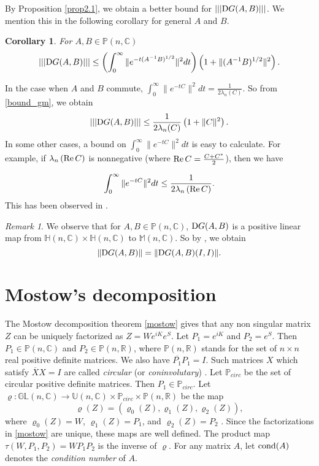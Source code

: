 \documentclass[12pt,epsfig,reqno]{amsart}
\newcommand{\C}{\mathbb{C}}
\newcommand{\R}{\mathbb{R}}
\newcommand{\De}{{\rm D}}
\newtheorem{corollary}[thm]{Corollary}
\theoremstyle{remark}
\newtheorem{remark}[thm]{Remark}
\newcommand{\h}{\mathop{{\rm Re}}}
\begin{document}
By Proposition \ref{prop2.1}, we obtain a better bound for $|||\De G(A,B)|||$. We mention this in the following corollary for general $A$ and $B$.
\begin{corollary}
For $A,B\in \mathbb P(n,\mathbb C)$
\begin{equation}
|||\De G(A,B)|||\leq
\left(\int_0^{\infty} \|e^{-t (A^{-1} B)^{1/2}}\|^2 dt\right)
\left(1+\|(A^{-1} B)^{1/2}\|^2\right).\label{bound_gm}
\end{equation}
\end{corollary}

In the case when $A$ and $B$ commute, $\int_0^{\infty} \|e^{-t C}\|^2 dt=\frac{1}{2\lambda_n(C)}.$
So from \eqref{bound_gm}, we obtain
\begin{equation}
|||\De G(A,B)|||\leq \frac{1}{2 \lambda_n(C)} \left(1+\|C\|^2\right).
\end{equation}
In some other cases, a bound on $\int_0^{\infty} \|e^{-t C}\|^2 dt$   is easy to calculate. For example, if  $\lambda_n\left(\h C\right)$ is nonnegative (where $\h C=\frac{C+C^*}{2}$), then we have

$$\int_0^{\infty} \|e^{-t C}\|^2 dt\leq \frac{1}{2 \lambda_n\left(\h C\right)}.$$
This has been observed in \cite{bhatia_Matrix_factorizations, bhatia_elsner}.

\begin{remark}
We observe that for $A,B\in \mathbb P(n,\mathbb C)$, $\De G(A,B)$ is a positive linear map from $\mathbb H(n, \C)\times \mathbb H(n, \C)$ to $\mathbb M(n,\C)$. So by \cite[Theorem 2.6.3]{bhatia_positive_definite}, we obtain $$\|\De G(A,B)\|= \|\De G(A,B)(I,I)\|. $$
\end{remark}

\section{Mostow's decomposition}
The Mostow decomposition theorem \eqref{mostow} gives that any non singular matrix $Z$ can be uniquely factorized as $Z=W e^{iK} e^S$. Let $P_1=e^{iK}$ and $P_2=e^S$.  Then $P_1\in \mathbb P(n, \C)$ and $P_2 \in \mathbb P(n,\R)$, where $\mathbb P(n,\R)$ stands for the set of $n\times n$ real positive definite matrices. We also have $\overline {P_1} P_1=I$. Such matrices $X$  which satisfy $\overline X X=I$ are  called \emph{circular} (or \emph{coninvolutary}) \cite{horn_tma}. Let $\mathbb P_{circ}$ be the set of circular positive definite matrices. Then $P_1\in \mathbb P_{circ}$.
Let $\varrho: \mathbb{GL}(n,\C)\rightarrow \mathbb{U}(n,\C)\times \mathbb P_{circ}\times \mathbb P(n,\R)$ be the map
\begin{equation}
\varrho( Z)= (\varrho_0(Z), \varrho_1(Z), \varrho_2(Z)),
\end{equation}
where $\varrho_0(Z)=W$, $\varrho_1(Z)=P_1$, and $\varrho_2(Z)=P_2$ .
Since the factorizations in \eqref{mostow} are unique, these maps are well defined. The product map $\tau(W, P_1, P_2)=W P_1 P_2$ is
 the inverse of $\varrho$. For any matrix $A$, let $\text{\rm cond} (A)$ denotes the \emph{condition number} of $A$.
\end{document}
